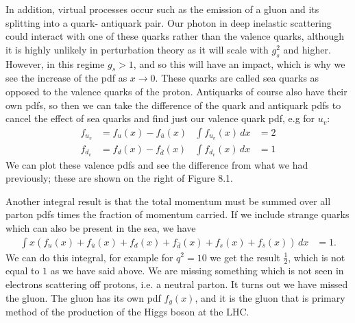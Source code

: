 \documentclass[a4paper, 11pt, normalem]{report}
\begin{document}
In addition, virtual processes occur such as the emission of a gluon and its splitting into a quark- antiquark pair.
Our photon in deep inelastic scattering could interact with one of these quarks rather than the valence quarks, although it is highly unlikely in perturbation theory as it will scale with $g_s^2$ and higher.
However, in this regime $g_s>1$, and so this will have an impact, which is why we see the increase of the pdf as $x\to0$.
These quarks are called sea quarks as opposed to the valence quarks of the proton.
Antiquarks of course also have their own pdfs, so then we can take the difference of the quark and antiquark pdfs to cancel the effect of sea quarks and find just our valence quark pdf, e.g for $u_v$:
\begin{align}
    f_{u_v} &= f_u(x) - f_{\bar{u}}(x) & \int f_{u_v}(x)\,dx &= 2\\
    f_{d_v} &= f_d(x) - f_{\bar{d}}(x) & \int f_{d_v}(x)\,dx &= 1
\end{align}
We can plot these valence pdfs and see the difference from what we had previously; these are shown on the right of Figure 8.1.

Another integral result is that the total momentum must be summed over all parton pdfs times the fraction of momentum carried.
If we include strange quarks which can also be present in the sea, we have
\begin{align}
    \int x\left(f_u(x)+f_{\bar{u}}(x)+f_d(x)+f_{\bar{d}}(x)+f_s(x)+f_{\bar{s}}(x)\right)\,dx &= 1.
\end{align}
We can do this integral, for example for $q^2=10$ we get the result $\frac12$, which is not equal to $1$ as we have said above.
We are missing something which is not seen in electrons scattering off protons, i.e. a neutral parton.
It turns out we have missed the gluon.
The gluon has its own pdf $f_g(x)$, and it is the gluon that is primary method of the production of the Higgs boson at the LHC.
\end{document}
